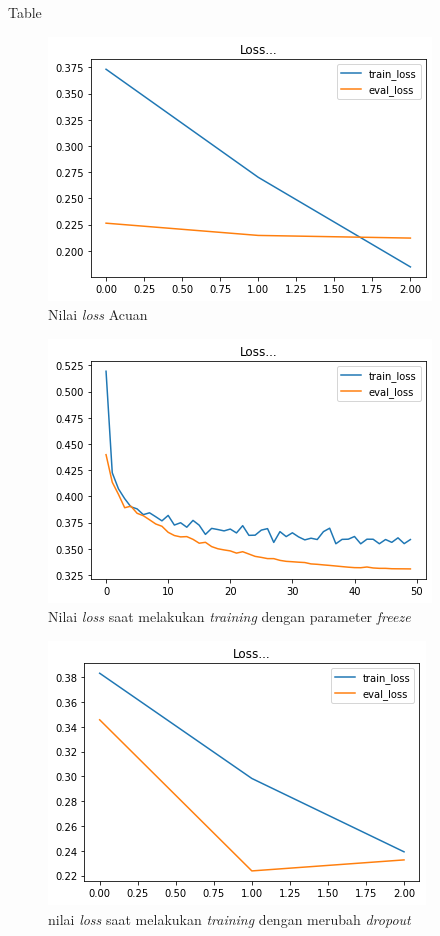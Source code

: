 Table

\begin{figure}[h]
  \begin{center}
    \includegraphics[width= 0.9\linewidth]{gambar/loss_concat_awal.png}
    \caption{Nilai \textit{loss} Acuan}
    \label{fig: loss_baseline}
  \end{center}
\end{figure}

\begin{figure}[h]
  \begin{center}
    \includegraphics[width= 0.9\linewidth]{gambar/loss_freeze_50.png}
    \caption{Nilai \textit{loss} saat melakukan \textit{training} dengan parameter \textit{freeze}}
    \label{fig: loss_freeze}
  \end{center}
\end{figure}

\begin{figure}[h]
  \begin{center}
    \includegraphics[width= 0.9\linewidth]{gambar/loss_dropout_new.png}
    \caption{nilai \textit{loss} saat melakukan \textit{training} dengan merubah \textit{dropout}}
    \label{fig: loss_dropout}
  \end{center}
\end{figure}